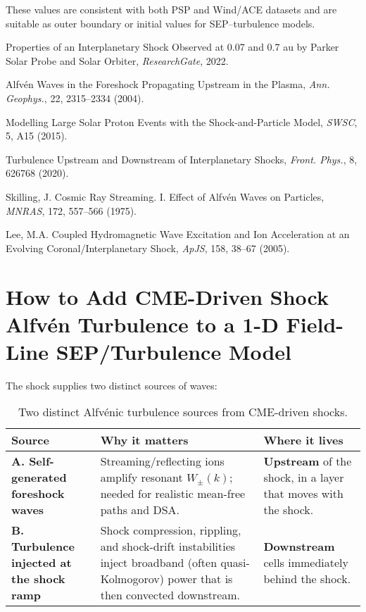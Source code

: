 These values are consistent with both PSP and Wind/ACE datasets and are suitable as outer boundary or initial values for SEP–turbulence models.

\begin{thebibliography}{9}
Properties of an Interplanetary Shock Observed at 0.07 and 0.7 au by Parker Solar Probe and Solar Orbiter, \textit{ResearchGate}, 2022.

Alfvén Waves in the Foreshock Propagating Upstream in the Plasma, \textit{Ann. Geophys.}, 22, 2315–2334 (2004).

Modelling Large Solar Proton Events with the Shock-and-Particle Model, \textit{SWSC}, 5, A15 (2015).

Turbulence Upstream and Downstream of Interplanetary Shocks, \textit{Front. Phys.}, 8, 626768 (2020).

Skilling, J. Cosmic Ray Streaming. I. Effect of Alfvén Waves on Particles, \textit{MNRAS}, 172, 557–566 (1975).

Lee, M.A. Coupled Hydromagnetic Wave Excitation and Ion Acceleration at an Evolving Coronal/Interplanetary Shock, \textit{ApJS}, 158, 38–67 (2005).
\end{thebibliography}

\section*{How to Add CME-Driven Shock Alfvén Turbulence to a 1-D Field-Line SEP/Turbulence Model}

The shock supplies two distinct sources of waves:

\begin{table}[h!]
\centering
\begin{tabular}{|l|p{6.2cm}|p{4.2cm}|}
\hline
\textbf{Source} & \textbf{Why it matters} & \textbf{Where it lives} \\
\hline
\textbf{A. Self-generated foreshock waves} & Streaming/reflecting ions amplify resonant $W_\pm(k)$; needed for realistic mean-free paths and DSA. & \textbf{Upstream} of the shock, in a layer that moves with the shock. \\
\textbf{B. Turbulence injected at the shock ramp} & Shock compression, rippling, and shock-drift instabilities inject broadband (often quasi-Kolmogorov) power that is then convected downstream. & \textbf{Downstream} cells immediately behind the shock. \\
\hline
\end{tabular}
\caption{Two distinct Alfvénic turbulence sources from CME-driven shocks.}
\end{table}

